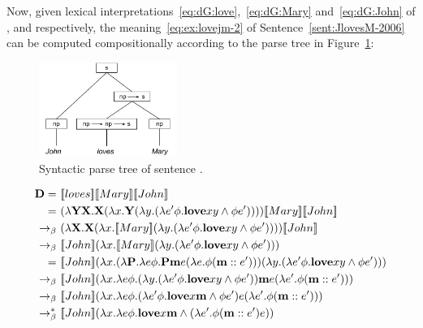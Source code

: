 \begin{example} Now, given lexical interpretations~\eqref{eq:dG:love},~\eqref{eq:dG:Mary} and~\eqref{eq:dG:John} of ,  and  respectively, the meaning~\eqref{eq:ex:lovejm-2} of Sentence~\eqref{sent:JlovesM-2006}  can be computed compositionally according to the parse tree in Figure~\ref{fig:JohnLovesMary-2}:
\begin{figure}[h!]
 \centering
    \includegraphics[width=0.4\textwidth]{images/JohnLovesMary.pdf}
\caption{Syntactic parse tree of sentence .} \label{fig:JohnLovesMary-2}
\end{figure}
\begin{align}
\D = \ & \I{loves} \I{Mary} \I{John}  \notag \\
= \ & (\lambda \Y2 \X2. \X2( \lambda \x1. \Y2 (\lambda \y1. ( \lambda e' \phi. \textbf{love} \x1 \y1 \land \phi e' ))) )  \I{Mary} \I{John}  \notag \\
\bconv \ & (\lambda  \X2. \X2( \lambda \x1. \I{Mary}  (\lambda \y1. ( \lambda e' \phi. \textbf{love} \x1 \y1 \land \phi e' ))) )  \I{John}  \notag \\
\bconv \ &    \I{John}( \lambda \x1. \I{Mary}  (\lambda \y1. ( \lambda e' \phi. \textbf{love} \x1 \y1 \land \phi e' )))   \notag \\
= \ &    \I{John}( \lambda \x1. (\lambda \P2. \lambda e \phi. \P2 \textbf{m} e (\lambda e. \phi (\upii{\textbf{m}}{e'})))  (\lambda \y1. ( \lambda e' \phi. \textbf{love} \x1 \y1 \land \phi e' )))   \notag \\
\bconv \ &    \I{John}( \lambda \x1.  \lambda e \phi. (\lambda \y1. ( \lambda e' \phi. \textbf{love} \x1 \y1 \land \phi e' )) \textbf{m} e (\lambda e'. \phi (\upii{\textbf{m}}{e'})))   \notag \\
\bconv \ &    \I{John}( \lambda \x1.  \lambda e \phi. ( \lambda e' \phi. \textbf{love} \x1 \textbf{m} \land \phi e' ) e (\lambda e' . \phi (\upii{\textbf{m}}{e'})))   \notag \\
\bred \ &    \I{John}( \lambda \x1.  \lambda e \phi.  \textbf{love} \x1 \textbf{m} \land  (\lambda e' .\phi (\upii{\textbf{m}}{e'}) e))   \notag \\

\end{align}
\end{example}
